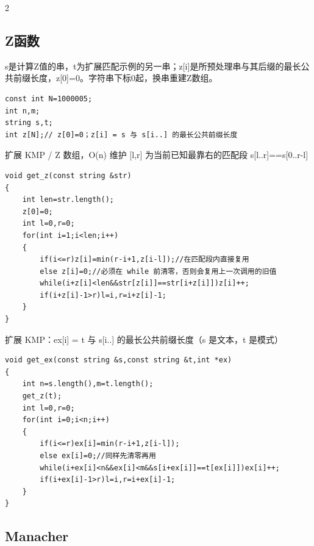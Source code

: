 \documentclass[UTF8,fontset=fandol,a4paper,twoside]{ctexart}
\newcommand{\note}[1]{{\fontsize{10}{12}\selectfont #1\par}}
\begin{document}
\begin{multicols}{2}
\subsection{Z函数}

\note{s是计算Z值的串，t为扩展匹配示例的另一串；z[\allowbreak{}i]\allowbreak{}是所预处理串与其后缀的最长公共前缀长度，z[\allowbreak{}0]\allowbreak{}=\allowbreak{}0。字符串下标0起，换串重建Z数组。}
\begin{lstlisting}
const int N=1000005;
int n,m;
string s,t;
int z[N];// z[0]=0；z[i] = s 与 s[i..] 的最长公共前缀长度
\end{lstlisting}
\note{扩展 KMP /\allowbreak{} Z 数组，O(\allowbreak{}n)\allowbreak{} 维护 [\allowbreak{}l,\allowbreak{}r]\allowbreak{} 为当前已知最靠右的匹配段 s[\allowbreak{}l.\allowbreak{}.\allowbreak{}r]\allowbreak{}=\allowbreak{}=\allowbreak{}s[\allowbreak{}0.\allowbreak{}.\allowbreak{}r-\allowbreak{}l]\allowbreak{}}
\begin{lstlisting}
void get_z(const string &str)
{
    int len=str.length();
    z[0]=0;
    int l=0,r=0;
    for(int i=1;i<len;i++)
    {
        if(i<=r)z[i]=min(r-i+1,z[i-l]);//在匹配段内直接复用
        else z[i]=0;//必须在 while 前清零，否则会复用上一次调用的旧值
        while(i+z[i]<len&&str[z[i]]==str[i+z[i]])z[i]++;
        if(i+z[i]-1>r)l=i,r=i+z[i]-1;
    }
}
\end{lstlisting}
\note{扩展 KMP：ex[\allowbreak{}i]\allowbreak{} =\allowbreak{} t 与 s[\allowbreak{}i.\allowbreak{}.\allowbreak{}]\allowbreak{} 的最长公共前缀长度（s 是文本，t 是模式）}
\begin{lstlisting}
void get_ex(const string &s,const string &t,int *ex)
{
    int n=s.length(),m=t.length();
    get_z(t);
    int l=0,r=0;
    for(int i=0;i<n;i++)
    {
        if(i<=r)ex[i]=min(r-i+1,z[i-l]);
        else ex[i]=0;//同样先清零再用
        while(i+ex[i]<n&&ex[i]<m&&s[i+ex[i]]==t[ex[i]])ex[i]++;
        if(i+ex[i]-1>r)l=i,r=i+ex[i]-1;
    }
}
\end{lstlisting}
\subsection{Manacher}


\end{multicols}
\end{document}
